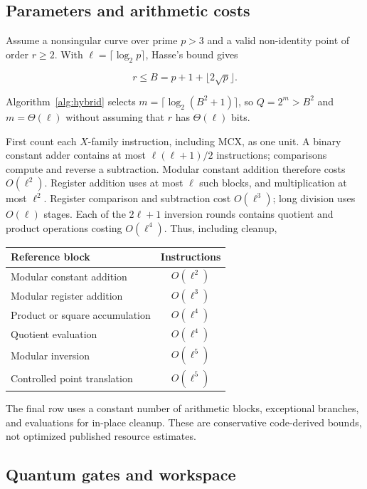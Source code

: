 \begin{revision}
\subsection{Parameters and arithmetic costs}

Assume a nonsingular curve over prime $p>3$ and a valid non-identity point of order $r\geq2$. With $\ell=\lceil\log_2p\rceil$, Hasse's bound \cite{Hasse1936} gives 

\[
    r\leq B=p+1+\lfloor2\sqrt p\rfloor.
\]

Algorithm~\ref{alg:hybrid} selects $m=\lceil\log_2(B^2+1)\rceil$, so $Q=2^m>B^2$ and $m=\Theta(\ell)$ without assuming that $r$ has $\Theta(\ell)$ bits.

First count each $X$-family instruction, including MCX, as one unit. A binary constant adder contains at most $\ell(\ell+1)/2$ instructions; comparisons compute and reverse a subtraction. Modular constant addition therefore costs $O(\ell^2)$. Register addition uses at most $\ell$ such blocks, and multiplication at most $\ell^2$. Register comparison and subtraction cost $O(\ell^3)$; long division uses $O(\ell)$ stages. Each of the $2\ell+1$ inversion rounds contains quotient and product operations costing $O(\ell^4)$. Thus, including cleanup,

\begin{center}
    \begin{tabular}{lc}
        \hline
        Reference block & Instructions\\
        \hline
        Modular constant addition & $O(\ell^2)$\\
        Modular register addition & $O(\ell^3)$\\
        Product or square accumulation & $O(\ell^4)$\\
        Quotient evaluation & $O(\ell^4)$\\
        Modular inversion & $O(\ell^5)$\\
        Controlled point translation & $O(\ell^5)$\\
        \hline
    \end{tabular}
\end{center}

The final row uses a constant number of arithmetic blocks, exceptional branches, and evaluations for in-place cleanup. These are conservative code-derived bounds, not optimized published resource estimates.

\subsection{Quantum gates and workspace}


\end{revision}
